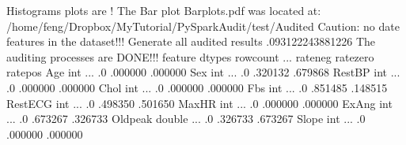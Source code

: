 \documentclass[letterpaper,12pt,english]{sphinxmanual}
\begin{document}
\begin{sphinxVerbatim}[commandchars=\\\{\}]
Histograms plots are !
The Bar plot Bar\PYGZus{}plots.pdf was located at:
/home/feng/Dropbox/MyTutorial/PySparkAudit/test/Audited
Caution: no date features in the dataset!!!
Generate all audited results   .093122243881226 
The auditing processes are DONE!!!
   feature  dtypes  row\PYGZus{}count    ...     rate\PYGZus{}neg  rate\PYGZus{}zero  rate\PYGZus{}pos
      Age     int            ...          .0   .000000  .000000
      Sex     int            ...          .0   .320132  .679868
   RestBP     int            ...          .0   .000000  .000000
     Chol     int            ...          .0   .000000  .000000
      Fbs     int            ...          .0   .851485  .148515
  RestECG     int            ...          .0   .498350  .501650
    MaxHR     int            ...          .0   .000000  .000000
    ExAng     int            ...          .0   .673267  .326733
  Oldpeak  double            ...          .0   .326733  .673267
    Slope     int            ...          .0   .000000  .000000


\end{sphinxVerbatim}
\end{document}
